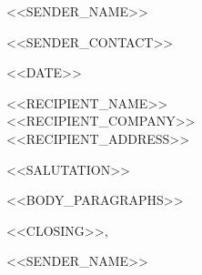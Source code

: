 \documentclass[11pt]{article}
\begin{document}
\begin{center}
  {
    \fontsize{36}{12} 
    \selectfont
    \color{accent} 
    <<SENDER_NAME>>
  } \\ \medskip

  {\color{gray}{\faEnvelope}} <<SENDER_CONTACT>>
\end{center}

\vspace{1em}
\noindent <<DATE>>

\vspace{2em}
\noindent <<RECIPIENT_NAME>> \\
<<RECIPIENT_COMPANY>> \\
<<RECIPIENT_ADDRESS>>

\vspace{2em}
\noindent <<SALUTATION>>

\vspace{1em}
<<BODY_PARAGRAPHS>>

\vspace{2em}
\noindent <<CLOSING>>,

\vspace{2em}
\noindent <<SENDER_NAME>>
\end{document}
